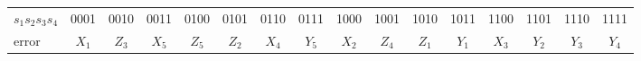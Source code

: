 \begin{tabular}{@{}lccccccccccccccc@{}}\toprule
$s_1s_2s_3s_4$ & 0001 & 0010 & 0011 & 0100 & 0101 & 0110 & 0111 & 1000 & 1001 & 1010 & 1011 & 1100 & 1101 & 1110 & 1111\\
error & $X_{1}$ & $Z_{3}$ & $X_{5}$ & $Z_{5}$ & $Z_{2}$ & $X_{4}$ & $Y_{5}$ & $X_{2}$ & $Z_{4}$ & $Z_{1}$ & $Y_{1}$ & $X_{3}$ & $Y_{2}$ & $Y_{3}$ & $Y_{4}$\\
\bottomrule\end{tabular}
